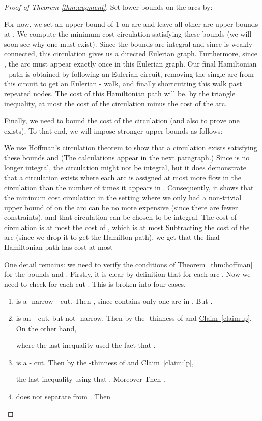\documentclass[11pt]{article}
\newcommand{\lref}[2][]{\hyperref[#2]{#1~\ref*{#2}}}
\theoremstyle{definition}
\begin{document}
\begin{proof}[Proof of Theorem \ref{thm:augment}]
Set lower bounds  on the arcs by:

For now, we set an upper bound of 1 on arc  and leave all other arc
upper bounds at . We compute the minimum cost circulation
satisfying these bounds (we will soon see why one must exist). Since the
bounds are integral and since  is weakly connected, this circulation
gives us a directed Eulerian graph. Furthermore, since , the  arc must appear exactly once in this Eulerian
graph. Our final Hamiltonian - path is obtained by following an
Eulerian circuit, removing the single  arc from this circuit to get
an Eulerian - walk, and finally shortcutting this walk past
repeated nodes. The cost of this Hamiltonian path will be, by the
triangle inequality, at most the cost of the circulation minus the cost
of the  arc.

Finally, we need to bound the cost of the circulation (and also to prove
one exists). To that end, we will impose stronger upper bounds  as follows:

We use Hoffman's circulation theorem to show that a circulation 
exists satisfying these bounds  and  (The calculations appear
in the next paragraph.) Since  is no longer integral, the circulation
 might not be integral, but it does demonstrate that a circulation
exists where each arc  is assigned at most
 more flow in the circulation than the number
of times it appears in . Consequently, it shows that the minimum
cost circulation  in the setting where we only had a non-trivial
upper bound of  on the arc  can be no more expensive (since there
are fewer constraints), and that circulation  can be chosen to be
integral. The cost of circulation  is at most the cost of , which
is at most
 Subtracting the cost of the  arc (since
we drop it to get the Hamilton path),
we get that the final Hamiltonian path has cost at most






One detail remains: we need to verify the conditions of
\lref[Theorem]{thm:hoffman} for the bounds  and .  Firstly, it is
clear by definition that  for each arc . Now we need
to check  for each cut
. This is broken into four cases.

\begin{enumerate}
\item  is a -narrow - cut. Then , since  contains only one arc in . But .

\item  is an - cut, but not -narrow. Then by the
  -thinness of  and \lref[Claim]{claim:lp},
   On the other hand,
  
  where the last inequality used the fact that .

\item  is a - cut. Then by the -thinness of  and \lref[Claim]{claim:lp},
  
  the last inequality using that .  Moreover
   Then .

\item  does not separate  from . Then
  
\end{enumerate}
\end{proof}
\end{document}
